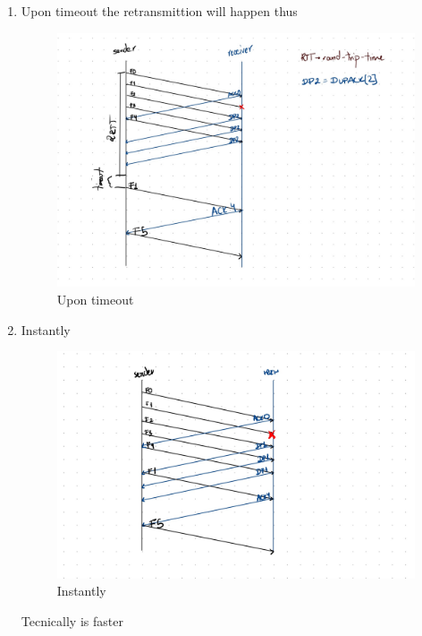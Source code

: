 \documentclass{assignment}
\begin{document}
\begin{enumerate}
  \item Upon timeout the retransmittion will happen thus
    \begin{figure}[h]
    \begin{center}
      \includegraphics[scale=0.3]{5.JPG}
    \end{center}
    \label{fig:3}
    \caption{Upon timeout}
    \end{figure}
    \newpage
  \item Instantly

    \begin{figure}[h]
    \begin{center}
      \includegraphics[scale=0.27]{3.JPG}
    \end{center}
    \caption{Instantly}
    \label{fig:4}
    \end{figure}
    Tecnically is faster
\end{enumerate}
\end{document}
